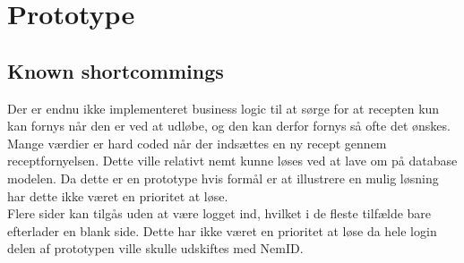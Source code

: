 \section{Prototype}




\newpage
\subsection{Known shortcommings}
Der er endnu ikke implementeret business logic til at sørge for at recepten kun kan fornys når den er ved at udløbe, og den kan derfor fornys så ofte det ønskes.\\
Mange værdier er hard coded når der indsættes en ny recept gennem receptfornyelsen. Dette ville relativt nemt kunne løses ved at lave om på database modelen. Da dette er en prototype hvis formål er at illustrere en mulig løsning har dette ikke været en prioritet at løse.\\
Flere sider kan tilgås uden at være logget ind, hvilket i de fleste tilfælde bare efterlader en blank side. Dette har ikke været en prioritet at løse da hele login delen af prototypen ville skulle udskiftes med NemID.
